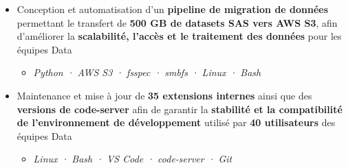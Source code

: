 \documentclass[10pt,english,french]{article}
\begin{document}
\begin{itemize}[leftmargin=0.5cm, label=\textbullet, itemsep=0.0625em]
    \item Conception et automatisation d'un \textbf{pipeline de migration de données}
          permettant le transfert de \textbf{500\raisebox{0.20ex}{\small +} GB de datasets
              SAS vers AWS S3}, afin d'améliorer la \textbf{scalabilité, l'accès et le
              traitement des données} pour les équipes Data
          \begin{itemize}[leftmargin=0.25cm,label=\textendash,itemsep=0em,topsep=0.2em]
              \item \textit{\fontsize{10pt}{9pt}\selectfont Python · AWS S3 · fsspec · smbfs · Linux · Bash}
          \end{itemize}


    \item Maintenance et mise à jour de \textbf{35\raisebox{0.20ex}{\small +} extensions
              internes} ainsi que des \textbf{versions de code-server} afin de garantir la
          \textbf{stabilité et la compatibilité de l'environnement de développement} utilisé par
          \textbf{40\raisebox{0.20ex}{\small +} utilisateurs} des équipes Data
          \begin{itemize}[leftmargin=0.25cm,label=\textendash,itemsep=0em,topsep=0.2em]
              \item \textit{\fontsize{10pt}{9pt}\selectfont Linux · Bash · VS Code · code-server · Git}
          \end{itemize}

\end{itemize}
\end{document}
